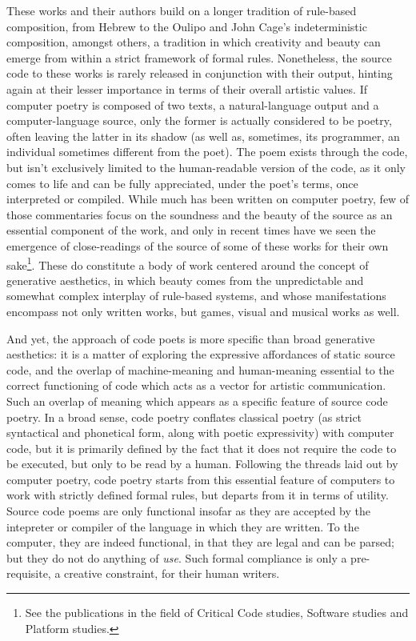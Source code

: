 These works and their authors build on a longer tradition of rule-based composition, from Hebrew to the Oulipo and John Cage's indeterministic composition, amongst others\cite{cramer_words_2003}, a tradition in which creativity and beauty can emerge from within a strict framework of formal rules. Nonetheless, the source code to these works is rarely released in conjunction with their output, hinting again at their lesser importance in terms of their overall artistic values. If computer poetry is composed of two texts, a natural-language output and a computer-language source, only the former is actually considered to be poetry, often leaving the latter in its shadow (as well as, sometimes, its programmer, an individual sometimes different from the poet). The poem exists through the code, but isn't exclusively limited to the human-readable version of the code, as it only comes to life and can be fully appreciated, under the poet's terms, once interpreted or compiled. While much has been written on computer poetry, few of those commentaries focus on the soundness and the beauty of the source as an essential component of the work, and only in recent times have we seen the emergence of close-readings of the source of some of these works for their own sake\footnote{See the publications in the field of Critical Code studies, Software studies and Platform studies.}. These do constitute a body of work centered around the concept of generative aesthetics\cite{goriunova_read_2005}, in which beauty comes from the unpredictable and somewhat complex interplay of rule-based systems, and whose manifestations encompass not only written works, but games, visual and musical works as well.

And yet, the approach of code poets is more specific than broad generative aesthetics: it is a matter of exploring the expressive affordances of static source code, and the overlap of machine-meaning and human-meaning essential to the correct functioning of code which acts as a vector for artistic communication. Such an overlap of meaning which appears as a specific feature of source code poetry. In a broad sense, code poetry conflates classical poetry (as strict syntactical and phonetical form, along with poetic expressivity) with computer code, but it is primarily defined by the fact that it does not require the code to be executed, but only to be read by a human. Following the threads laid out by computer poetry, code poetry starts from this essential feature of computers to work with strictly defined formal rules, but departs from it in terms of utility. Source code poems are only functional insofar as they are accepted by the intepreter or compiler of the language in which they are written. To the computer, they are indeed functional, in that they are legal and can be parsed; but they do not do anything of \emph{use}. Such formal compliance is only a pre-requisite, a creative constraint, for their human writers.

